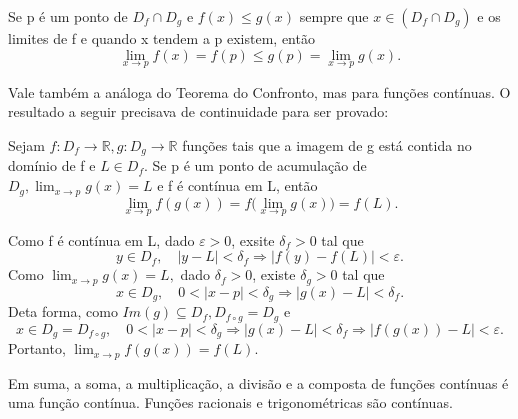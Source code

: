 \documentclass[analysis_notes.tex]{subfiles}
\begin{document}
\begin{theorem*}
	Se p \'e um ponto de $D_{f}\cap D_{g}$ e $f(x)\leq{g(x)}$ sempre que $x\in{(D_{f}\cap D_{g})}$ e os limites de f e
	quando x tendem a p existem, ent\~ao
	$$
		\lim_{x\to p}f(x) = f(p)\leq{g(p)} = \lim_{x\to p}g(x).
	$$
\end{theorem*}
Vale tamb\'em a an\'aloga do Teorema do Confronto, mas para fun\c c\~oes cont\'inuas. O resultado a seguir precisava
de continuidade para ser provado:
\begin{theorem*}
	Sejam $f:D_{f}\rightarrow \mathbb{R}, g:D_{g}\rightarrow \mathbb{R}$ fun\c c\~oes tais que a imagem de g est\'a contida
	no dom\'inio de f e $L\in D_{f}.$ Se p \'e um ponto de acumula\c c\~ao de $D_{g}, \lim_{x\to p}g(x) = L$ e f \'e cont\'inua
	em L, ent\~ao
	$$
		\lim_{x\to p}f(g(x)) = f\biggl(\lim_{x\to p}g(x)\biggr) = f(L).
	$$
\end{theorem*}
\begin{proof*}
	Como f \'e cont\'inua em L, dado $\varepsilon > 0$, exsite $\delta_{f}>0$ tal que
	$$
		y\in D_{f},\quad |y-L|<\delta_{f} \Rightarrow |f(y)-f(L)|<\varepsilon.
	$$
	Como $\lim_{x\to p}g(x) = L,$ dado $\delta_{f}>0$, existe $\delta_{g}>0$ tal que
	$$
		x\in D_{g},\quad 0 <|x-p|<\delta_{g} \Rightarrow |g(x)-L|<\delta_{f}.
	$$
	Deta forma, como $Im(g)\subseteq{D_{f}}, D_{f\circ{g}}=D_{g}$ e
	$$
		x\in D_{g}=D_{f\circ{g}}, \quad 0<|x-p|<\delta_{g}\Rightarrow|g(x)-L|<\delta_{f}\Rightarrow|f(g(x))-L|<\varepsilon.
	$$
	Portanto, $\lim_{x\to p}f(g(x))=f(L).$ \qedsymbol
\end{proof*}
Em suma, a soma, a multiplica\c c\~ao, a divis\~ao e a composta de fun\c c\~oes cont\'inuas \'e uma fun\c c\~ao cont\'inua. Fun\c c\~oes
racionais e trigonom\'etricas s\~ao cont\'inuas.
\end{document}

